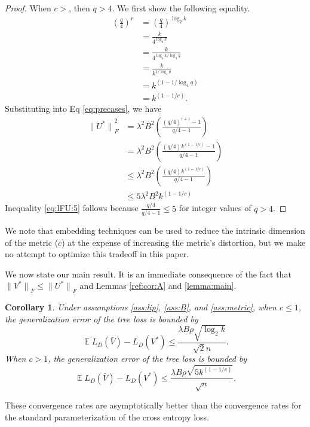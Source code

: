 \documentclass[twoside]{article}
\newtheorem{corollary}{Corollary}
\DeclareMathOperator{\E}{\mathbb E}
\renewcommand{\star}[1]{{#1}^{*}}
\newcommand{\lF}[1]{{\lVert {#1} \rVert}_F}
\begin{document}
\begin{proof}
When $c>$, then $q>4$.
We first show the following equality.
\begin{align}
\left(\frac q 4\right)^r
&=
\left(\frac q 4\right)^{\log_q k}\\
&=
\frac{k}{4^{\log_q k}}\\
&=
\frac{k}{4^{{\log_4 k}/{\log_4 q}}}\\
&=
\frac{k}{k^{1/\log_4 q}}\\
&=
k^{\left(1 - {1}/{\log_4 q}\right)} \\
&=
k^{\left(1 - 1/c\right)}
.
\label{eq:lFU:frac}
\end{align}
Substituting into Eq \eqref{eq:precases}, we have
\begin{align}
    \lF{\star U}^2
    &= \lambda^2B^2 \left(\frac{(q/4)^{r+1}-1}{q/4-1}\right) \\
    \label{eq:lFU:4}
    &= \lambda^2B^2 \left(\frac{(q/4)k^{(1-1/c)}-1}{q/4-1}\right) \\
    &\le \lambda^2B^2 \left(\frac{(q/4)k^{(1-1/c)}}{q/4-1}\right) \\
    &\le 5 \lambda^2B^2 k^{(1-1/c)}
    \label{eq:lFU:5}
\end{align}
    Inequality \eqref{eq:lFU:5} follows because $\tfrac{q/4}{q/4-1} \le 5$ for integer values of $q>4$.
\end{proof}
We note that embedding techniques can be used to reduce the intrinsic dimension of the metric ($c$) at the expense of increasing the metric's distortion,
but we make no attempt to optimize this tradeoff in this paper.

We now state our main result.
It is an immediate consequence of the fact that $\lF{\star V} \le \lF{\star U}$ and Lemmas \ref{ref:cor:A} and \ref{lemma:main}.
\begin{corollary}
    \label{cor:main}
    Under assumptions \ref{ass:lip}, \ref{ass:B}, and \ref{ass:metric},
    when $c\le1$, the generalization error of the tree loss is bounded by
\begin{equation}
    \E L_D(\bar V) - L_D(V^*)
    \le \frac {\lambda B\rho \sqrt{\log_2 k}}{\sqrt 2n}
    .
\end{equation}
    When $c>1$, the generalization error of the tree loss is bounded by
\begin{equation}
    \E L_D(\bar V) - L_D(V^*)
    \le \frac {\lambda B\rho \sqrt{5 k^{(1-1/c)}}}{\sqrt n}
    .
\end{equation}
\end{corollary}
These convergence rates are asymptotically better than the convergence rates for the standard parameterization of the cross entropy loss.
\end{document}
